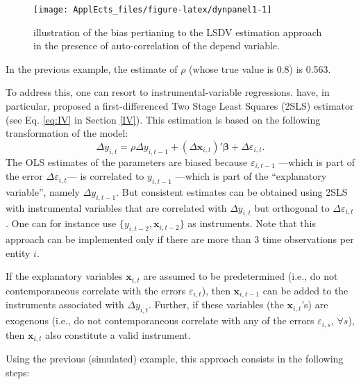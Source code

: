 \documentclass[
  12pt,
]{book}
\theoremstyle{definition}
\theoremstyle{definition}
\theoremstyle{definition}
\theoremstyle{definition}
\theoremstyle{remark}
\begin{document}
\begin{figure}
\texttt{[image: ApplEcts\_files/figure-latex/dynpanel1-1]} \caption{illustration of the bias pertianing to the LSDV estimation approach in the presence of auto-correlation of the depend variable.}\label{fig:dynpanel1}
\end{figure}

In the previous example, the estimate of \(\rho\) (whose true value is 0.8) is 0.563.

To address this, one can resort to instrumental-variable regressions. \citet{Anderson_Hsiao_1982} have, in particular, proposed a first-differenced Two Stage Least Squares (2SLS) estimator (see Eq. \eqref{eq:IV} in Section \ref{IV}). This estimation is based on the following transformation of the model:
\begin{equation}
\Delta y_{i,t} = \rho \Delta y_{i,t-1} + (\Delta \mathbf{x}_{i,t})'\boldsymbol\beta + \Delta\varepsilon_{i,t}.\label{eq:paneldynFisrtDiff}
\end{equation}
The OLS estimates of the parameters are biased because \(\varepsilon_{i,t-1}\) ---which is part of the error \(\Delta\varepsilon_{i,t}\)--- is correlated to \(y_{i,t-1}\) ---which is part of the ``explanatory variable'', namely \(\Delta y_{i,t-1}\). But consistent estimates can be obtained using 2SLS with instrumental variables that are correlated with \(\Delta y_{i,t}\) but orthogonal to \(\Delta\varepsilon_{i,t}\). One can for instance use \(\{y_{i,t-2},\mathbf{x}_{i,t-2}\}\) as instruments. Note that this approach can be implemented only if there are more than 3 time observations per entity \(i\).

If the explanatory variables \(\mathbf{x}_{i,t}\) are assumed to be predetermined (i.e., do not contemporaneous correlate with the errors \(\varepsilon_{i,t}\)), then \(\mathbf{x}_{i,t-1}\) can be added to the instruments associated with \(\Delta y_{i,t}\). Further, if these variables (the \(\mathbf{x}_{i,t}\)'s) are exogenous (i.e., do not contemporaneous correlate with any of the errors \(\varepsilon_{i,s}\), \(\forall s\)), then \(\mathbf{x}_{i,t}\) also constitute a valid instrument.

Using the previous (simulated) example, this approach consists in the following steps:
\end{document}

